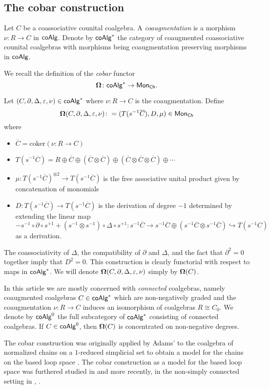 

\subsection{The cobar construction}

Let $C$ be a coassociative counital coalgebra. A \textit{coaugmentation} is a morphism $\nu \colon R \to C$ in $\mathsf{coAlg}$.
Denote by $\mathsf{coAlg}^*$ the category of coaugmented coassociative counital coalgebras with morphisms being coaugmentation preserving morphisms in $\mathsf{coAlg}$. 

We recall the definition of the \textit{cobar} functor 
$$ \mathbf{\Omega} \colon \mathsf{coAlg}^* \to \mathsf{Mon}_{\mathsf{Ch}}.$$

Let  $(C, \partial, \Delta, \varepsilon, \nu)  \in \mathsf{coAlg}^*$ where $\nu \colon R \to C$ is the coaugmentation. Define
$$ \mathbf{\Omega}(C, \partial, \Delta, \varepsilon, \nu)  \colon= ( T(s^{-1}  \overline{C} ), D, \mu) \in \mathsf{Mon}_{\mathsf{Ch}}$$ where 
\begin{itemize}
\item $\overline{C}=\text{coker}(\nu \colon R \to C)$
\item $T(s^{-1} \overline{C})= R \oplus \overline{C} \oplus (\overline{C}  \otimes \overline{C} ) \oplus ( \overline{C} \otimes \overline{C} \otimes \overline{C} ) \oplus\cdots $
\item $\mu \colon T(s^{-1}  \overline{C} )^{\otimes 2} \to T(s^{-1}  \overline{C} ) $ is the free associative unital product given by concatenation of monomials
\item $D \colon T(s^{-1}  \overline{C} ) \to T(s^{-1}  \overline{C} )$ is the derivation of degree $-1$ determined by extending the linear map $$- s^{-1} \circ \partial \circ s^{+1} + (s^{-1} \otimes s^{-1}) \circ \Delta \circ s^{+1} \colon s^{-1}\overline{C} \to s^{-1}\overline{C} \oplus (s^{-1}\overline{C} \otimes s^{-1}\overline{C}) \hookrightarrow T(s^{-1}C)$$ as a derivation.
\end{itemize}

The coassociativity of $\Delta$, the compatibility of $\partial$ and $\Delta$, and the fact that $\partial^2 =0$ together imply that $D^2=0$. This construction is clearly functorial with respect to maps in $\mathsf{coAlg}^*$. We will denote $ \mathbf{\Omega} (C, \partial, \Delta, \varepsilon, \nu)$ simply by $ \mathbf{\Omega}(C)$. 

In this article we are mostly concerned with \textit{connected} coalgebras, namely coaugmented coalgebras $C \in \mathsf{coAlg}^*$ which are non-negatively graded and the coaugmentation $\nu \colon R \to C$ induces an isomorphism of coalgebras $R \cong C_0$. We denote by $\mathsf{coAlg}^0$ the full subcategory of $\mathsf{coAlg}^*$ consisting of connected coalgebras. If $C \in \mathsf{coAlg}^0$, then $ \mathbf{\Omega}(C)$ is concentrated on non-negative degrees. 

The cobar construction was originally applied by Adams' to the coalgebra of normalized chains on a $1$-reduced simplicial set to obtain a model for the chains on the based loop space \cite{Adams}. The cobar construction as a model for the based loop space was furthered studied in \cite{Baues} and more recently, in the non-simply connected setting in \cite{Hess-Tonks}, \cite{Rivera-Zeinalian}.
